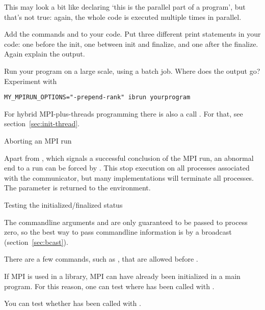 This may look a bit like declaring `this is the parallel part of a
program', but that's not true: again, the whole code is executed
multiple times in parallel.

\begin{exercise}
  \label{ex:hello2}
  Add the commands  and 
  to your code. Put three different print statements in your code: one before the init,
  one between init and finalize, and one after the finalize. Again explain the output.

  Run your program on a large scale, using a batch job.
  Where does the output go?
  Experiment with
\begin{verbatim}
MY_MPIRUN_OPTIONS="-prepend-rank" ibrun yourprogram
\end{verbatim}
\end{exercise}

\begin{remark}
  For hybrid MPI-plus-threads programming there is also a call
  . For that, see
  section~\ref{sec:init-thread}.
\end{remark}

 {Aborting an MPI run}

Apart from , which signals a successful
conclusion of the MPI run, an abnormal end to a run can be forced by
.
%
This stop execution on all processes associated with the communicator,
but many implementations will terminate all processes. The  parameter
is returned to the environment.


 {Testing the initialized/finalized status}

The commandline arguments  and  are only guaranteed to
be passed to process zero, so the best way to pass commandline information
is by a broadcast (section~\ref{sec:bcast}).

There are a few commands, such as
, that are allowed before
.

If MPI is used in a library, MPI can have already been initialized in a main program.
For this reason, one can test where  has been called with
%
.

You can test whether  has been called with
%
.

